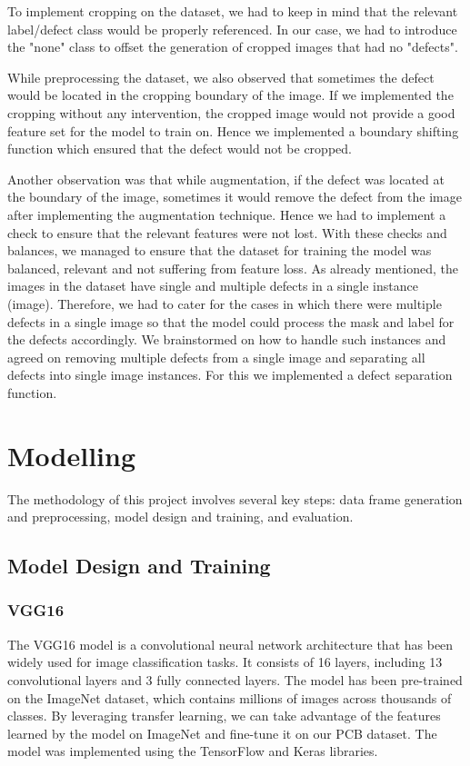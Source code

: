 \documentclass[12pt]{article}
\begin{document}
To implement cropping on the dataset, we had to keep in mind that the relevant label/defect class would be properly referenced. In our case, we had to introduce the "none" class to offset the generation of cropped images that had no "defects".

While preprocessing the dataset, we also observed that sometimes the defect would be located in the cropping boundary of the image. If we implemented the cropping without any intervention, the cropped image would not provide a good feature set for the model to train on. Hence we implemented a boundary shifting function which ensured that the defect would not be cropped.

Another observation was that while augmentation, if the defect was located at the boundary of the image, sometimes it would remove the defect from the image after implementing the augmentation
technique. Hence we had to implement a check to ensure that the relevant features were not lost. With these checks and balances, we managed to ensure that the dataset for training the model was balanced, relevant and not suffering from feature loss.
As already mentioned, the images in the dataset have single and multiple defects in a single instance (image). Therefore, we had to cater for the cases in which there were multiple defects in a single image so that the model could process the mask and label for the defects accordingly. We brainstormed on how to handle such instances and agreed on removing multiple defects from a single image and separating all defects into single image instances. For this we implemented a defect separation function.

\clearpage
\newpage

\section{Modelling}
The methodology of this project involves several key steps: data frame generation and preprocessing, model design and training, and evaluation.


\subsection{Model Design and Training}

\subsubsection{VGG16}

The VGG16 model is a convolutional neural network architecture that has been widely used for image classification tasks. It consists of 16 layers, including 13 convolutional layers and 3 fully connected layers. The model has been pre-trained on the ImageNet dataset, which contains millions of images across thousands of classes. By leveraging transfer learning, we can take advantage of the features learned by the model on ImageNet and fine-tune it on our PCB dataset.
The model was implemented using the TensorFlow and Keras libraries. 
\end{document}
